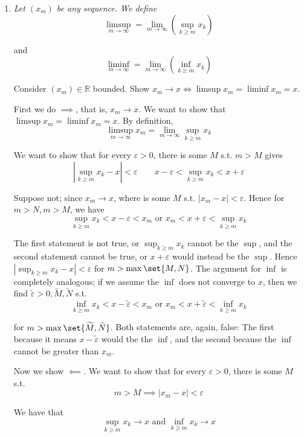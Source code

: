 \documentclass{article}
\begin{document}
\begin{enumerate}[1.]
  \item {\itshape
    Let $(x_m)$ be any sequence. We define
    \[
      \limsup_{m \to \infty} = \lim_{m \to \infty} \left(\sup_{k \ge m} x_k\right)
    \]

    and
    \[
      \liminf_{m \to \infty} = \lim_{m \to \infty} \left(\inf_{k \ge m} x_k\right)
    \]

    Consider $(x_m) \in \mathbb{R}$ bounded. Show $x_m \to x \iff \limsup x_m = \liminf x_m = x$.}

    \solution First we do $\implies$, that is, $x_m \to x$. We want to show that $\limsup x_m = \liminf x_m = x$. By definition,
    \[
      \limsup_{m \to \infty} x_m
      =
      \lim_{m \to \infty} \sup_{k \ge m} x_k
    \]

    We want to show that for every $\varepsilon > 0$, there is some $M$ s.t. $m > M$ gives
    \[
      |\sup_{k \ge m} x_k - x| < \varepsilon
      \quad\quad
      x - \varepsilon < \sup_{k \ge m} x_k < x + \varepsilon
    \]

    Suppose not; since $x_m \to x$, where is some $M$ s.t. $|x_m - x| < \varepsilon$. Hence for $m > N, m > M$, we have
    \[
      \sup_{k \ge m} x_k < x - \varepsilon < x_m
      \text{ or }
      x_m < x + \varepsilon < \sup_{k \ge m} x_k
    \]

    The first statement is not true, or $\sup_{k \ge m} x_k$ cannot be the $\sup$, and the second statement cannot be true, or $x + \varepsilon$ would instead be the $\sup$. Hence $|\sup_{k \ge m} x_k - x| < \varepsilon$ for $m > \max\set{M, N}$. The argument for $\inf$ is completely analogous; if we assume the $\inf$ does not converge to $x$, then we find $\widetilde{\varepsilon} > 0, \widetilde{M}, \widetilde{N}$ s.t.
    \[
      \inf_{k \ge m} x_k < x - \widetilde{\varepsilon} < x_m
      \text{ or }
      x_m < x + \widetilde{\varepsilon} < \inf_{k \ge m} x_k
    \]

    for $m > \max\set{\widetilde{M}, \widetilde{N}}$. Both statements are, again, false: The first because it means $x - \widetilde{\varepsilon}$ would tbe the $\inf$, and the second because the $\inf$ cannot be greater than $x_m$.

    Now we show $\impliedby$.  We want to show that for every $\varepsilon > 0$, there is some $M$ s.t.
    \[
      m > M \implies |x_m - x| < \varepsilon
    \]

    We have that
    \[
      \sup_{k \ge m} x_k \to x
      \text{ and }
      \inf_{k \ge m} x_k \to x
    \]


\end{enumerate}
\end{document}
